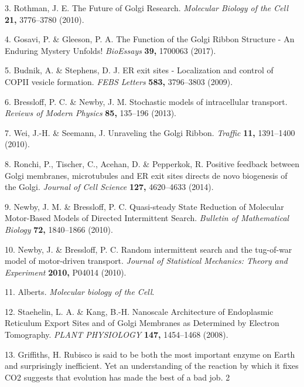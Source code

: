 \documentclass{Dissertate}
\begin{document}
\leavevmode\hypertarget{ref-rothman_future_2010}{}%
3. Rothman, J. E. The Future of Golgi Research. \emph{Molecular Biology
of the Cell} \textbf{21,} 3776--3780 (2010).

\leavevmode\hypertarget{ref-gosavi_function_2017}{}%
4. Gosavi, P. \& Gleeson, P. A. The Function of the Golgi Ribbon
Structure - An Enduring Mystery Unfolds! \emph{BioEssays} \textbf{39,}
1700063 (2017).

\leavevmode\hypertarget{ref-budnik_er_2009}{}%
5. Budnik, A. \& Stephens, D. J. ER exit sites - Localization and
control of COPII vesicle formation. \emph{FEBS Letters} \textbf{583,}
3796--3803 (2009).

\leavevmode\hypertarget{ref-bressloff_stochastic_2013}{}%
6. Bressloff, P. C. \& Newby, J. M. Stochastic models of intracellular
transport. \emph{Reviews of Modern Physics} \textbf{85,} 135--196
(2013).

\leavevmode\hypertarget{ref-wei_unraveling_2010}{}%
7. Wei, J.-H. \& Seemann, J. Unraveling the Golgi Ribbon. \emph{Traffic}
\textbf{11,} 1391--1400 (2010).

\leavevmode\hypertarget{ref-ronchi_positive_2014}{}%
8. Ronchi, P., Tischer, C., Acehan, D. \& Pepperkok, R. Positive
feedback between Golgi membranes, microtubules and ER exit sites directs
de novo biogenesis of the Golgi. \emph{Journal of Cell Science}
\textbf{127,} 4620--4633 (2014).

\leavevmode\hypertarget{ref-newby_quasi-steady_2010}{}%
9. Newby, J. M. \& Bressloff, P. C. Quasi-steady State Reduction of
Molecular Motor-Based Models of Directed Intermittent Search.
\emph{Bulletin of Mathematical Biology} \textbf{72,} 1840--1866 (2010).

\leavevmode\hypertarget{ref-newby_random_2010}{}%
10. Newby, J. \& Bressloff, P. C. Random intermittent search and the
tug-of-war model of motor-driven transport. \emph{Journal of Statistical
Mechanics: Theory and Experiment} \textbf{2010,} P04014 (2010).

\leavevmode\hypertarget{ref-alberts_molecular_nodate}{}%
11. Alberts. \emph{Molecular biology of the Cell}.

\leavevmode\hypertarget{ref-staehelin_nanoscale_2008}{}%
12. Staehelin, L. A. \& Kang, B.-H. Nanoscale Architecture of
Endoplasmic Reticulum Export Sites and of Golgi Membranes as Determined
by Electron Tomography. \emph{PLANT PHYSIOLOGY} \textbf{147,} 1454--1468
(2008).

\leavevmode\hypertarget{ref-griffiths_rubisco_nodate}{}%
13. Griffiths, H. Rubisco is said to be both the most important enzyme
on Earth and surprisingly inefficient. Yet an understanding of the
reaction by which it fixes CO2 suggests that evolution has made the best
of a bad job. 2
\end{document}
